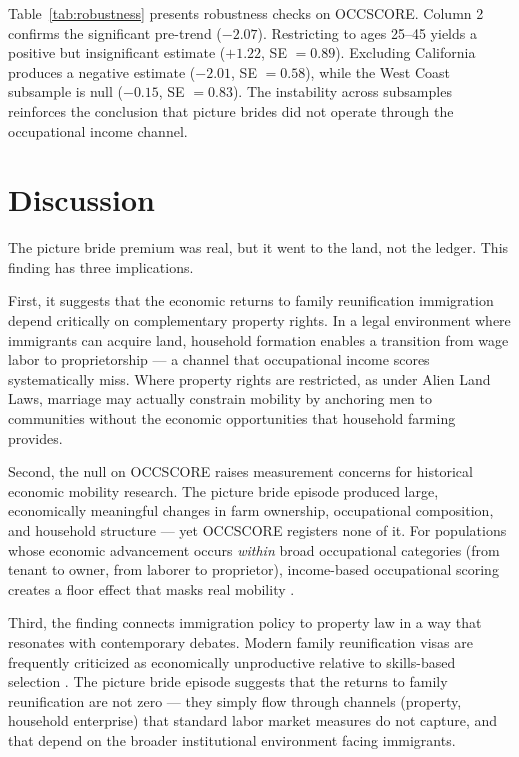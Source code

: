 \documentclass[12pt]{article}
\begin{document}


Table~\ref{tab:robustness} presents robustness checks on OCCSCORE. Column 2 confirms the significant pre-trend ($-2.07$). Restricting to ages 25--45 yields a positive but insignificant estimate ($+1.22$, SE $= 0.89$). Excluding California produces a negative estimate ($-2.01$, SE $= 0.58$), while the West Coast subsample is null ($-0.15$, SE $= 0.83$). The instability across subsamples reinforces the conclusion that picture brides did not operate through the occupational income channel.

\section{Discussion}

The picture bride premium was real, but it went to the land, not the ledger. This finding has three implications.

First, it suggests that the economic returns to family reunification immigration depend critically on complementary property rights. In a legal environment where immigrants can acquire land, household formation enables a transition from wage labor to proprietorship --- a channel that occupational income scores systematically miss. Where property rights are restricted, as under Alien Land Laws, marriage may actually constrain mobility by anchoring men to communities without the economic opportunities that household farming provides.

Second, the null on OCCSCORE raises measurement concerns for historical economic mobility research. The picture bride episode produced large, economically meaningful changes in farm ownership, occupational composition, and household structure --- yet OCCSCORE registers none of it. For populations whose economic advancement occurs \textit{within} broad occupational categories (from tenant to owner, from laborer to proprietor), income-based occupational scoring creates a floor effect that masks real mobility \citep{abramitzky2014nation, ward2020boundaries}.

Third, the finding connects immigration policy to property law in a way that resonates with contemporary debates. Modern family reunification visas are frequently criticized as economically unproductive relative to skills-based selection \citep{borjas1999heaven}. The picture bride episode suggests that the returns to family reunification are not zero --- they simply flow through channels (property, household enterprise) that standard labor market measures do not capture, and that depend on the broader institutional environment facing immigrants.
\end{document}
